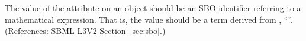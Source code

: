 The value of the attribute  on an \Event object should be
an SBO identifier referring to a mathematical expression.  That is, the
value should be a term derived from \sbointeractionID,
``''.  (References: SBML L3V2 Section~\ref{sec:sbo}.)
